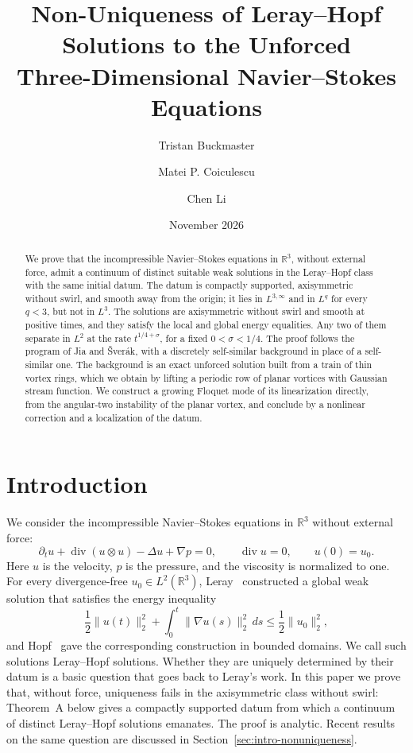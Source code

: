 \documentclass[11pt]{article}
\title{Non-Uniqueness of Leray--Hopf Solutions to the Unforced\\
Three-Dimensional Navier--Stokes Equations}
\author{Tristan Buckmaster \and Matei P. Coiculescu \and Chen Li}
\date{November 2026}
\numberwithin{equation}{section}
\theoremstyle{definition}
\theoremstyle{remark}
\theoremstyle{plain}
\newcommand{\R}{\mathbb R}
\begin{document}
\maketitle
\begin{abstract}
We prove that the incompressible Navier--Stokes equations in $\R^3$,
without external force, admit a continuum of distinct suitable weak
solutions in the Leray--Hopf class with the same initial datum. The datum is compactly supported,
axisymmetric without swirl, and smooth away from the origin; it lies in
$L^{3,\infty}$ and in $L^q$ for every $q<3$, but not in $L^3$. The
solutions are axisymmetric without swirl and smooth at positive times,
and they satisfy the local and global energy equalities. Any two
of them separate in $L^2$ at the rate $t^{1/4+\sigma}$, for a fixed
$0<\sigma<1/4$. The proof follows the program of Jia and \v Sver\'ak,
with a discretely self-similar background in place of a self-similar one.
The background is an exact unforced solution built from a train of thin
vortex rings, which we obtain by lifting a periodic row of planar vortices
with Gaussian stream function. We construct a growing Floquet mode of its
linearization directly, from the angular-two instability of the planar
vortex, and conclude by a nonlinear correction and a localization of the
datum.
\end{abstract}

\tableofcontents

\section{Introduction}
\label{sec:intro}

We consider the incompressible Navier--Stokes equations in $\R^3$
without external force:
\begin{equation}\label{eq:ns}
 \partial_tu+\operatorname{div}(u\otimes u)-\Delta u+\nabla p=0,
 \qquad \operatorname{div}u=0,\qquad u(0)=u_0.
\end{equation}
Here $u$ is the velocity, $p$ is the pressure, and the viscosity is
normalized to one. For every divergence-free $u_0\in L^2(\R^3)$,
Leray~\cite{leray1934} constructed a global weak solution that satisfies
the energy inequality
\[
 \frac12\|u(t)\|_2^2+\int_0^t\|\nabla u(s)\|_2^2\,ds
 \le\frac12\|u_0\|_2^2,
\]
and Hopf~\cite{hopf1951} gave the corresponding construction in bounded
domains. We call such solutions Leray--Hopf solutions. Whether they are
uniquely determined by their datum is a basic question that goes back to
Leray's work. In this paper we prove that, without force, uniqueness fails
in the axisymmetric class without swirl: Theorem~A below gives a compactly
supported datum from which a continuum of distinct Leray--Hopf solutions
emanates. The proof is analytic. Recent results on the same question are
discussed in Section~\ref{sec:intro-nonuniqueness}.
\end{document}
